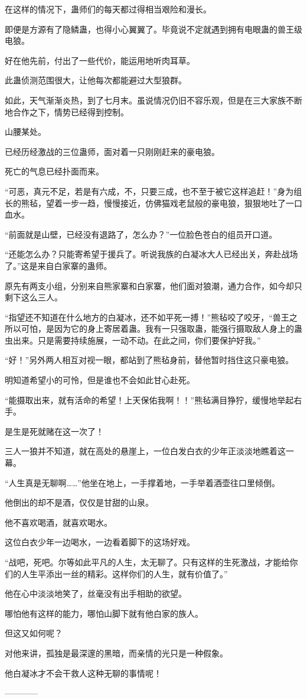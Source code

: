 \begin{this_body}
在这样的情况下，蛊师们的每天都过得相当艰险和漫长。

即便是方源有了隐鳞蛊，也得小心翼翼了。毕竟说不定就遇到拥有电眼蛊的兽王级电狼。

好在他先前，付出了一些代价，能运用地听肉耳草。

此蛊侦测范围很大，让他每次都能避过大型狼群。

如此，天气渐渐炎热，到了七月末。虽说情况仍旧不容乐观，但是在三大家族不断地合作之下，情势已经得到控制。

山腰某处。

已经历经激战的三位蛊师，面对着一只刚刚赶来的豪电狼。

死亡的气息已经扑面而来。

“可恶，真元不足，若是有六成，不，只要三成，也不至于被它这样追赶！”身为组长的熊毡，望着一步一趋，慢慢接近，仿佛猫戏老鼠般的豪电狼，狠狠地吐了一口血水。

“前面就是山壁，已经没有退路了，怎么办？”一位脸色苍白的组员开口道。

“还能怎么办？只能寄希望于援兵了。听说我族的白凝冰大人已经出关，奔赴战场了。”这是来自白家寨的蛊师。

原先有两支小组，分别来自熊家寨和白家寨，他们面对狼潮，通力合作，如今却只剩下这么三人。

“指望还不知道在什么地方的白凝冰，还不如平死一搏！”熊毡咬了咬牙，“兽王之所以可怕，是因为它的身上寄居着蛊。我有一只强取蛊，能强行摄取敌人身上的蛊虫出来。只是需要持续施展，一动不动。在此之间，你们要保护好我。”

“好！”另外两人相互对视一眼，都站到了熊毡身前，替他暂时挡住这只豪电狼。

明知道希望小的可怜，但是谁也不会如此甘心赴死。

“能摄取出来，就有活命的希望！上天保佑我啊！！”熊毡满目狰狞，缓慢地举起右手。

是生是死就赌在这一次了！

三人一狼并不知道，就在高处的悬崖上，一位白发白衣的少年正淡淡地瞧着这一幕。

“人生真是无聊啊……”他坐在地上，一手撑着地，一手举着酒壶往口里倾倒。

他倒出的却不是酒，仅仅是甘甜的山泉。

他不喜欢喝酒，就喜欢喝水。

这位白衣少年一边喝水，一边看着脚下的这场好戏。

“战吧，死吧。尔等如此平凡的人生，太无聊了。只有这样的生死激战，才能给你们的人生平添出一丝的精彩。这样你们的人生，就有价值了。”

他在心中淡淡地笑了，丝毫没有出手相助的欲望。

哪怕他有这样的能力，哪怕山脚下就有他白家的族人。

但这又如何呢？

对他来讲，孤独是最深邃的黑暗，而亲情的光只是一种假象。

他白凝冰才不会干救人这种无聊的事情呢！

------------

\end{this_body}

